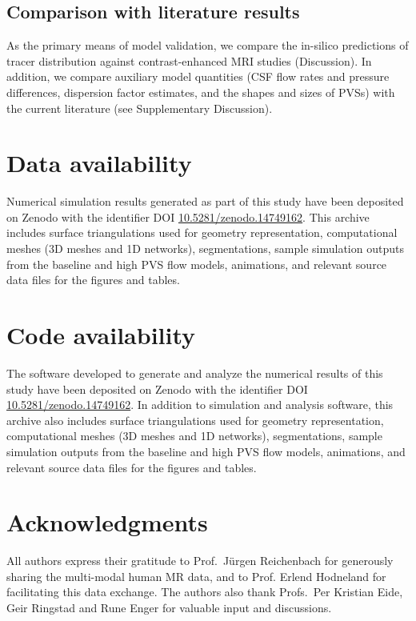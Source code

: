 \documentclass[fleqn,10pt]{wlscirep}
\begin{document}
\subsection*{Comparison with literature results}

As the primary means of model validation, we compare the in-silico
predictions of tracer distribution against contrast-enhanced MRI
studies (Discussion). In addition, we compare auxiliary model
quantities (CSF flow rates and pressure differences, dispersion factor
estimates, and the shapes and sizes of PVSs) with the current
literature (see Supplementary Discussion).

\section*{Data availability}

Numerical simulation results generated as part of this study have been deposited on Zenodo with the identifier DOI \href{https://doi.org/10.5281/zenodo.14749162}{10.5281/zenodo.14749162}. This archive includes surface triangulations used for geometry representation, computational meshes (3D meshes and
1D networks), segmentations, sample simulation outputs from the
baseline and high PVS flow models, animations, and relevant source data files
for the figures and tables.

\section*{Code availability}

The software developed to generate and analyze the numerical results
of this study have been deposited on Zenodo with the identifier DOI \href{https://doi.org/10.5281/zenodo.14749162}{10.5281/zenodo.14749162}. In addition to simulation and analysis software, this archive also includes surface triangulations used for geometry representation, computational meshes (3D meshes and 1D
networks), segmentations, sample simulation outputs from the baseline
and high PVS flow models, animations, and relevant source data files for the
figures and tables.



\section*{Acknowledgments}

All authors express their gratitude to Prof.~Jürgen Reichenbach for
generously sharing the multi-modal human MR data, and to Prof. Erlend
Hodneland for facilitating this data exchange. The authors also thank
Profs.~Per Kristian Eide, Geir Ringstad and Rune Enger for valuable
input and discussions.
\end{document}
